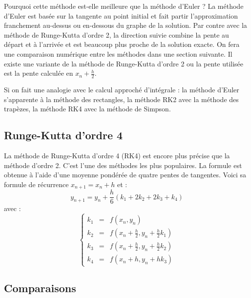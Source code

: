 \documentclass[11pt,class=report,crop=false]{standalone}
\begin{document}
Pourquoi cette méthode est-elle meilleure que la méthode d'Euler ? La méthode d'Euler est basée sur la tangente au point initial et fait partir l'approximation franchement au-dessus ou en-dessous du graphe de la solution. Par contre avec la méthode de Runge-Kutta d'ordre 2, la direction suivie combine la pente au départ et à l'arrivée et est beaucoup plus proche de la solution exacte.
On fera une comparaison numérique entre les méthodes dans une section suivante.
Il existe une variante de la méthode de Runge-Kutta d'ordre 2 ou la pente utilisée est la pente calculée en $x_n + \frac{h}{2}$.


Si on fait une analogie avec le calcul approché d'intégrale : la méthode d'Euler s'apparente à la méthode des rectangles, 
la méthode RK2 avec la méthode des trapèzes, 
la méthode RK4 avec la méthode de Simpson.



\subsection{Runge-Kutta d'ordre 4}

La méthode de Runge-Kutta d'ordre 4 (RK4) est encore plus précise que la méthode d'ordre 2. C'est l'une des méthodes les plus populaires.
La formule est obtenue à l'aide d'une moyenne pondérée de quatre pentes de tangentes.
Voici sa formule de récurrence $x_{n+1} = x_n+h$ et :
$$y_{n+1} = y_n + \frac h6 \left( k_1 + 2 k_2 + 2 k_3 + k_4 \right)$$
avec :
$$
\left\lbrace  
\begin{array}{rcl}
  k_1 &=& f(x_n,y_n) \\
  k_2 &=& f(x_n + \frac h2, y_n + \frac h2 k_1) \\
  k_3 &=& f(x_n + \frac h2, y_n + \frac h2 k_2) \\
  k_4 &=& f(x_n + h, y_n + h k_3)
\end{array}
\right.
$$



\subsection{Comparaisons}
\end{document}
